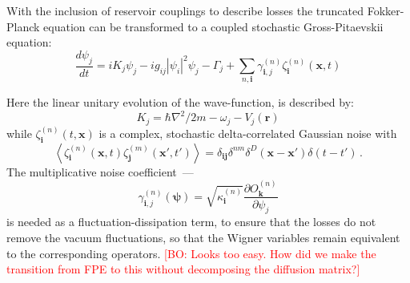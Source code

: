 \documentclass[aps,prl,twocolumn,showpacs,amsmath,amssymb,superscriptaddress]{revtex4-1}
\newcommand{\bogdansremark}[1]{\textcolor{red}{{[}BO: #1{]}}}
\begin{document}
With the inclusion of reservoir couplings to describe losses
the truncated Fokker-Planck equation can be transformed
to a coupled stochastic Gross-Pitaevskii equation:
\begin{equation}
	\frac{d\psi_{j}}{dt} = iK_{j} \psi_{j} - ig_{ij} |\psi_{i}|^{2} \psi_{j} - \Gamma_{j} +
		\sum_{n,\mathbf{i}} \gamma_{\mathbf{i},j}^{(n)} \zeta_{\mathbf{i}}^{(n)} (\mathbf{x},t)
\end{equation}

Here the linear unitary evolution of the wave-function, is described by:
\begin{equation}
	K_{j} = \hbar \nabla^{2}/2m - \omega_{j} - V_{j} \left( \mathbf{r} \right)
\end{equation}
while $\zeta_{\mathbf{i}}^{(n)}(t,\mathbf{x})$ is a complex,
stochastic delta-correlated Gaussian noise with
\begin{equation}
	\left\langle
		\zeta_{\mathbf{i}}^{(n)} (\mathbf{x},t) \zeta_{\mathbf{j}}^{(m)}(\mathbf{x}',t')
	\right\rangle =
	\delta_{\mathbf{ij}} \delta^{nm} \delta^{D} \left(
		\mathbf{x} - \mathbf{x}'
	\right)
	\delta \left( t - t' \right)\,.
\end{equation}
The multiplicative noise coefficient~---
\begin{equation}
	\gamma_{\mathbf{i},j}^{(n)} \left( \boldsymbol{\psi} \right) =
	\sqrt{\kappa_{\mathbf{i}}^{(n)}}
	\frac{\partial O_{\mathbf{k}}^{(n)}}{\partial\psi_{j}}
\end{equation}
is needed as a fluctuation-dissipation term,
to ensure that the losses do not remove the vacuum fluctuations,
so that the Wigner variables remain equivalent to the corresponding operators.
	\bogdansremark{Looks too easy. How did we make the transition from FPE to this
	without decomposing the diffusion matrix?}
\end{document}
